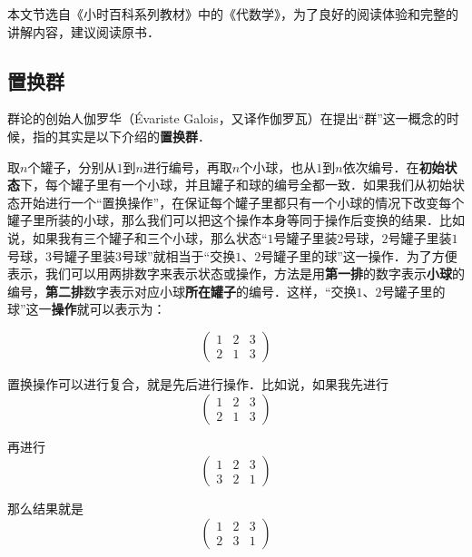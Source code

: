 

本文节选自《小时百科系列教材》中的《代数学》，为了良好的阅读体验和完整的讲解内容，建议阅读原书．


\subsection{置换群}

群论的创始人伽罗华（Évariste Galois，又译作伽罗瓦）在提出“群”这一概念的时候，指的其实是以下介绍的\textbf{置换群}．

取$n$个罐子，分别从$1$到$n$进行编号，再取$n$个小球，也从$1$到$n$依次编号．在\textbf{初始状态}下，每个罐子里有一个小球，并且罐子和球的编号全都一致．如果我们从初始状态开始进行一个“置换操作”，在保证每个罐子里都只有一个小球的情况下改变每个罐子里所装的小球，那么我们可以把这个操作本身等同于操作后变换的结果．比如说，如果我有三个罐子和三个小球，那么状态“$1$号罐子里装$2$号球，$2$号罐子里装$1$号球，$3$号罐子里装$3$号球”就相当于“交换$1$、$2$号罐子里的球”这一操作．为了方便表示，我们可以用两排数字来表示状态或操作，方法是用\textbf{第一排}的数字表示\textbf{小球}的编号，\textbf{第二排}数字表示对应小球\textbf{所在罐子}的编号．这样，“交换$1$、$2$号罐子里的球”这一\textbf{操作}就可以表示为：

\begin{equation}\begin{pmatrix}
1&2&3\\2&1&3
\end{pmatrix}\end{equation}


置换操作可以进行复合，就是先后进行操作．比如说，如果我先进行\begin{equation}\begin{pmatrix}
1&2&3\\2&1&3
\end{pmatrix}\end{equation}

再进行\begin{equation}\begin{pmatrix}
1&2&3\\3&2&1
\end{pmatrix}\end{equation}

那么结果就是\begin{equation}\begin{pmatrix}
1&2&3\\2&3&1
\end{pmatrix}\end{equation}

